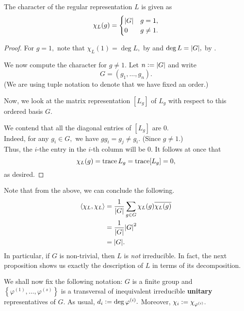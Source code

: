 \begin{prop} \label{prop:charofregrep}
	The character of the regular representation $L$ is given as
	\begin{equation*} 
		\chi_L(g) = \begin{cases}
			{\left\lvert G \right\lvert} & g = 1,\\
			0 & g \neq 1.
		\end{cases}
	\end{equation*}
\end{prop}
\begin{proof} 
	For $g = 1,$ note that $\chi_L(1) = \deg L,$ by  and $\deg L = {\left\lvert G \right\lvert},$ by .

	We now compute the character for $g \neq 1.$ Let $n \vcentcolon= {\left\lvert G \right\lvert}$ and write
	\begin{equation*} 
		G = (g_1, \ldots, g_n).
	\end{equation*}
	(We are using tuple notation to denote that we have fixed an order.) 

	Now, we look at the matrix representation $[L_g]$ of $L_g$ with respect to this ordered basis $G.$

	We contend that all the diagonal entries of $[L_g]$ are $0.$\\
	Indeed, for any $g_i \in G,$ we have $gg_i = g_j \neq g_i.$ (Since $g \neq 1.$) \\
	Thus, the $i$-the entry in the $i$-th column will be $0.$ It follows at once that 
	\begin{equation*} 
		\chi_L(g) = \operatorname{trace} L_g = \operatorname{trace} [L_g] = 0,
	\end{equation*} 
	as desired.
\end{proof}

\begin{rem}
	Note that from the above, we can conclude the following.
	\begin{align*} 
		\langle \chi_L, \chi_L\rangle &= \frac{1}{{\left\lvert G \right\lvert}}\sum_{g \in G} \chi_L(g)\overline{\chi_L(g)}\\
		&= \dfrac{1}{{\left\lvert G \right\lvert}}{\left\lvert G \right\lvert}^2\\
		&= {\left\lvert G \right\lvert}.
	\end{align*}
	In particular, if $G$ is non-trivial, then $L$ is \emph{not} irreducible. In fact, the next proposition shows us exactly the description of $L$ in terms of its decomposition.
\end{rem}

We shall now fix the following notation: $G$ is a finite group and $\left\{\varphi^{(1)}, \ldots, \varphi^{(s)}\right\}$ is a transversal of inequivalent irreducible \textbf{unitary} representatives of $G.$ As usual, $d_i \vcentcolon= \deg \varphi^{(i)}.$ Moreover, $\chi_i \vcentcolon= \chi_{\varphi^{(i)}}.$

